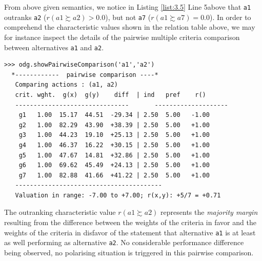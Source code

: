 From above given semantics, we notice in Listing \ref{list:3.5} Line 5above that \texttt{a1} outranks \texttt{a2} ($r(a1 \succsim a2) > 0.0$), but not \texttt{a7} ($r(a1 \succsim a7) = 0.0$). In order to comprehend the characteristic values shown in the relation table above, we may for instance inspect the details of the pairwise multiple criteria comparison between alternatives \texttt{a1} and \texttt{a2}.
\begin{lstlisting}[caption={Inspecting a pairwise multiple criteria comparison},label=list:3.6]
>>> odg.showPairwiseComparison('a1','a2')
  *------------  pairwise comparison ----*
   Comparing actions : (a1, a2)
   crit. wght.  g(x)  g(y)    diff  | ind   pref    r() 
   -------------------------------  	 --------------------
    g1   1.00  15.17  44.51  -29.34 | 2.50  5.00   -1.00 
    g2   1.00  82.29  43.90  +38.39 | 2.50  5.00   +1.00 
    g3   1.00  44.23  19.10  +25.13 | 2.50  5.00   +1.00 
    g4   1.00  46.37  16.22  +30.15 | 2.50  5.00   +1.00 
    g5   1.00  47.67  14.81  +32.86 | 2.50  5.00   +1.00 
    g6   1.00  69.62  45.49  +24.13 | 2.50  5.00   +1.00 
    g7   1.00  82.88  41.66  +41.22 | 2.50  5.00   +1.00 
   ----------------------------------------
   Valuation in range: -7.00 to +7.00; r(x,y): +5/7 = +0.71
\end{lstlisting}

The outranking characteristic value $r(a1 \succsim a2)$ represents the \emph{majority margin} resulting from the difference between the weights of the criteria in favor and the weights of the criteria in disfavor of the statement that alternative \texttt{a1} is at least as well performing as alternative \texttt{a2}. No considerable performance difference being observed, no polarising situation is triggered in this pairwise comparison.

